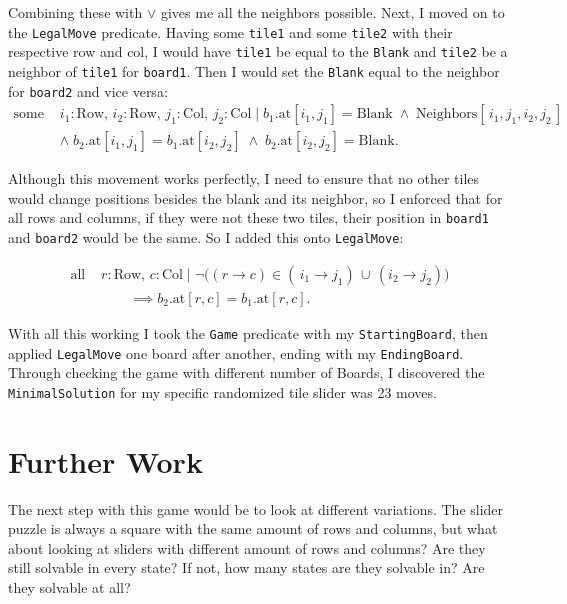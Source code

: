 \documentclass[12pt]{article}
\theoremstyle{definition} \newtheorem{prob}{Problem}
\theoremstyle{definition} \newtheorem{cprob}{Challenge Problem}
\theoremstyle{definition} \newtheorem{sol}{Solution}
\begin{document}
Combining these with $\vee$ gives me all the neighbors possible. Next, I moved on to the \texttt{LegalMove} predicate. Having some \texttt{tile1} and some \texttt{tile2} with their respective row and col, I would have \texttt{tile1} be equal to the \texttt{Blank} and \texttt{tile2} be a neighbor of \texttt{tile1} for \texttt{board1}. 
Then I would set the \texttt{Blank} equal to the neighbor for \texttt{board2} and vice versa:
\begin{align*}
  \text{some } &i_1:\mathrm{Row},\,i_2:\mathrm{Row},\,j_1:\mathrm{Col},\,j_2:\mathrm{Col}\;\big|\;
    b_1.\mathrm{at}[i_1,j_1] = \mathrm{Blank}
    \;\wedge\;
    \mathrm{Neighbors}[\,i_1,j_1,i_2,j_2\,]\\
  &\wedge\;
    b_2.\mathrm{at}[i_1,j_1] = b_1.\mathrm{at}[i_2,j_2]
    \;\wedge\;
    b_2.\mathrm{at}[i_2,j_2] = \mathrm{Blank}.
\end{align*}

Although this movement works perfectly, I need to ensure that no other tiles would change positions besides the blank and its neighbor, so I enforced that for all rows and columns, if they were not these two tiles, their position in \texttt{board1} and \texttt{board2} would be the same. So I added this onto \texttt{LegalMove}:

\begin{align*}
  \text{all } &r:\mathrm{Row},\,c:\mathrm{Col}\;|\;\neg\bigl((r\!\to\!c)\in (\,i_1\!\to\!j_1)\,\cup\,(i_2\!\to\!j_2)\bigr)\\
  &\qquad\implies b_2.\mathrm{at}[r,c] = b_1.\mathrm{at}[r,c].
\end{align*}

With all this working I took the \texttt{Game} predicate with my \texttt{StartingBoard}, then applied \texttt{LegalMove} one board after another, ending with my \texttt{EndingBoard}. Through checking the game with different number of Boards, I discovered the \texttt{MinimalSolution} for my specific randomized tile slider was 23 moves.



\section{Further Work}
The next step with this game would be to look at different variations. The slider puzzle is always a square with the same amount of rows and columns, but what about looking at sliders with different amount of rows and columns? Are they still solvable in every state? If not, how many states are they solvable in? Are they solvable at all?
\end{document}

